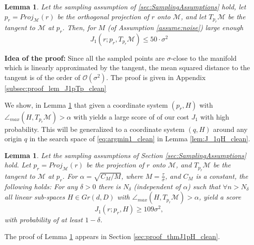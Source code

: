 \documentclass[12pt]{article}
\newtheorem{Lemma}[Theorem]{Lemma}
\theoremstyle{remark}
\newcommand{\MM}{\mathcal{M}}
\newcommand{\OO}{\mathcal{O}}
\newcommand{\sM}{{M}}
\begin{document}
\begin{Lemma}\label{lem:J1pTp_clean}
	Let the sampling assumption of \ref{sec:SamplingAssumptions} hold, let ${p_r} = Proj_\MM(r)$ be the orthogonal projection of $r$ onto $\MM$, and let $ T_{p_r}\MM $ be the tangent to $ \MM $ at $ {p_r} $.
	Then, for $M$ (of Assumption \ref{assume:noise}) large enough
	\begin{equation}\label{eq:TangentScore_clean}
		J_1(r; {p_r}, T_{{p_r}}\MM) \leq 50 \cdot \sigma^2 
	\end{equation}
\end{Lemma}
\textbf{Idea of the proof: } Since all the sampled points are $\sigma$-close to the manifold which is linearly approximated by the tangent, the mean squared distance to the tangent is of the order of $\OO(\sigma^2)$.
The proof is given in Appendix \ref{subsec:proof_lem_J1pTp_clean}


We show, in Lemma \ref{thm:J1pH_clean} that given a coordinate system $(p_r, H)$ with $\angle_{max}(H,T_{{p_r}}\MM) > \alpha$ with yields a large score of of our cost $J_1$ with high probability.
This will be generalized to a coordinate system $(q, H)$ around any origin $q$ in the search space of \eqref{eq:argmin1_clean} in Lemma \ref{lem:J_1qH_clean}.

\begin{Lemma}\label{thm:J1pH_clean}
	Let the sampling assumptions of Section \ref{sec:SamplingAssumptions} hold.
	Let ${p_r} = Proj_\MM(r)$ be the projection of $r$ onto $\MM$, and $ T_{p_r}\MM $ be the tangent to $ \MM $ at $ {p_r} $. 
	For $\alpha = \sqrt{C_\sM/M}$, where $M = \frac{\tau}{\sigma}$, and $C_\sM$ is a constant,
	the following holds: For any $\delta >0$ there is $N_\delta$ (independent of $\alpha$) such that $\forall n > N_\delta$ all linear sub-spaces $H\in Gr(d,D)$ with $\angle_{max}(H,T_{{p_r}}\MM) > \alpha$, yield a score 
	\[J_1(r; {p_r}, H) \geq 109 \sigma^2 ,\]
	with probability of at least $1 - \delta$.
\end{Lemma}

The proof of Lemma \ref{thm:J1pH_clean} appears in Section \ref{sec:proof_thmJ1pH_clean}.
\end{document}
